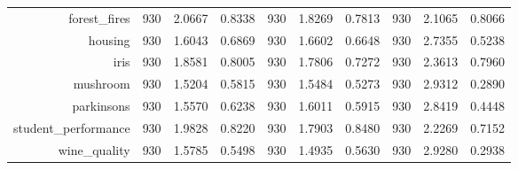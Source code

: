 \begin{table}[htbp]
{\begin{tabular}{rccccccccc}
                  forest\_fires                       & 930                                & 2.0667                                                                    & 0.8338          & 930            & \cellcolor[rgb]{ .776,  .937,  .808}\textcolor[rgb]{ 0,  .38,  0}{1.8269}          & 0.7813          & 930            & 2.1065          & 0.8066          \\
                  housing                             & 930                                & \cellcolor[rgb]{ .776,  .937,  .808}\textcolor[rgb]{ 0,  .38,  0}{1.6043} & 0.6869          & 930            & 1.6602                                                                             & 0.6648          & 930            & 2.7355          & 0.5238          \\
                  iris                                & 930                                & 1.8581                                                                    & 0.8005          & 930            & \cellcolor[rgb]{ .776,  .937,  .808}\textcolor[rgb]{ 0,  .38,  0}{1.7806}          & 0.7272          & 930            & 2.3613          & 0.7960          \\
                  mushroom                            & 930                                & \cellcolor[rgb]{ .776,  .937,  .808}\textcolor[rgb]{ 0,  .38,  0}{1.5204} & 0.5815          & 930            & 1.5484                                                                             & 0.5273          & 930            & 2.9312          & 0.2890          \\
                  parkinsons                          & 930                                & \cellcolor[rgb]{ .776,  .937,  .808}\textcolor[rgb]{ 0,  .38,  0}{1.5570} & 0.6238          & 930            & 1.6011                                                                             & 0.5915          & 930            & 2.8419          & 0.4448          \\
                  student\_performance                & 930                                & 1.9828                                                                    & 0.8220          & 930            & \cellcolor[rgb]{ .776,  .937,  .808}\textcolor[rgb]{ 0,  .38,  0}{1.7903}          & 0.8480          & 930            & 2.2269          & 0.7152          \\
                  wine\_quality                       & 930                                & 1.5785                                                                    & 0.5498          & 930            & \cellcolor[rgb]{ .776,  .937,  .808}\textcolor[rgb]{ 0,  .38,  0}{1.4935}          & 0.5630          & 930            & 2.9280          & 0.2938          \\

\end{tabular}}
\end{table}
